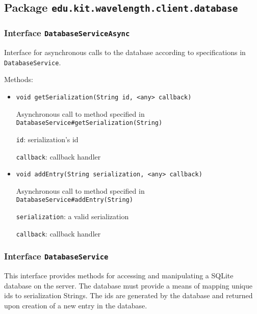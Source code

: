 \subsection{Package \lstinline{edu.kit.wavelength.client.database}}
\label{pkg:edu.kit.wavelength.client.database}


\subsubsection{Interface \texttt{DatabaseServiceAsync}}
\label{type:edu.kit.wavelength.client.database.DatabaseServiceAsync}
Interface for asynchronous calls to the database according to specifications in \texttt{DatabaseService}.

Methods:
\begin{itemize}
\item \texttt{void getSerialization(String id, <any> callback)}

Asynchronous call to method specified in \texttt{DatabaseService#getSerialization(String)}

\texttt{id}: serialization's id

\texttt{callback}: callback handler

\item \texttt{void addEntry(String serialization, <any> callback)}

Asynchronous call to method specified in \texttt{DatabaseService#addEntry(String)}

\texttt{serialization}: a valid serialization

\texttt{callback}: callback handler

\end{itemize}

\subsubsection{Interface \texttt{DatabaseService}}
\label{type:edu.kit.wavelength.client.database.DatabaseService}
This interface provides methods for accessing and manipulating a SQLite
 database on the server. The database must provide a means of mapping unique
 ids to serialization Strings. The ids are generated by the database and
 returned upon creation of a new entry in the database.

